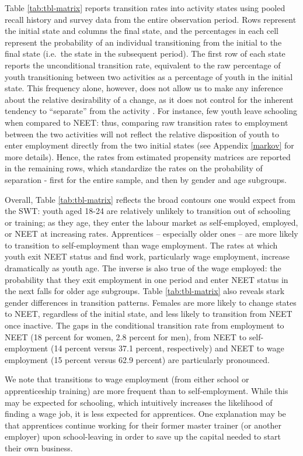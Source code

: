 \documentclass[
  a4paper, twoside, 12pt]{book}
\begin{document}
Table \ref{tab:tbl-matrix} reports transition rates into activity states using pooled recall history and survey data from the entire observation period. Rows represent the initial state and columns the final state, and the percentages in each cell represent the probability of an individual transitioning from the initial to the final state (i.e.~the state in the subsequent period). The first row of each state reports the unconditional transition rate, equivalent to the raw percentage of youth transitioning between two activities as a percentage of youth in the initial state. This frequency alone, however, does not allow us to make any inference about the relative desirability of a change, as it does not control for the inherent tendency to ``separate'' from the activity \autocite{bosch2010}. For instance, few youth leave schooling when compared to NEET: thus, comparing raw transition rates to employment between the two activities will not reflect the relative disposition of youth to enter employment directly from the two initial states (see Appendix \ref{markov} for more details). Hence, the rates from estimated propensity matrices are reported in the remaining rows, which standardize the rates on the probability of separation - first for the entire sample, and then by gender and age subgroups.

Overall, Table \ref{tab:tbl-matrix} reflects the broad contours one would expect from the SWT: youth aged 18-24 are relatively unlikely to transition out of schooling or training; as they age, they enter the labour market as self-employed, employed, or NEET at increasing rates. Apprentices -- especially older ones -- are more likely to transition to self-employment than wage employment. The rates at which youth exit NEET status and find work, particularly wage employment, increase dramatically as youth age. The inverse is also true of the wage employed: the probability that they exit employment in one period and enter NEET status in the next falls for older age subgroups. Table \ref{tab:tbl-matrix} also reveals stark gender differences in transition patterns. Females are more likely to change states to NEET, regardless of the initial state, and less likely to transition from NEET once inactive. The gaps in the conditional transition rate from employment to NEET (18 percent for women, 2.8 percent for men), from NEET to self-employment (14 percent versus 37.1 percent, respectively) and NEET to wage employment (15 percent versus 62.9 percent) are particularly pronounced.

We note that transitions to wage employment (from either school or apprenticeship training) are more frequent than to self-employment. While this may be expected for schooling, which intuitively increases the likelihood of finding a wage job, it is less expected for apprentices. One explanation may be that apprentices continue working for their former master trainer (or another employer) upon school-leaving in order to save up the capital needed to start their own business.
\end{document}
